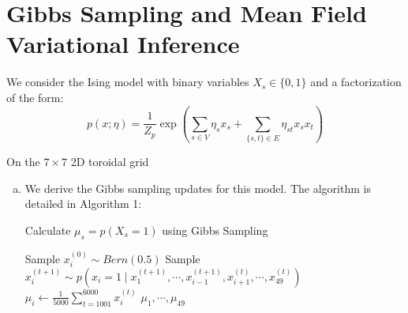 \documentclass[paper=a4, fontsize=11pt]{scrartcl} %
\numberwithin{equation}{section} %
\numberwithin{figure}{section} %
\numberwithin{table}{section} %
\begin{document}
\section{Gibbs Sampling and Mean Field Variational Inference}

We consider the Ising model with binary variables $X_s\in\{0,1\}$ and a factorization of the form:
\begin{equation}
p(x;\eta)=\frac{1}{Z_p}\exp\left( \sum_{s\in V} \eta_s x_s + \sum_{\{s,t\}\in E} \eta_{st} x_s x_t \right)
\end{equation}

On the $7\times7$ 2D toroidal grid

\begin{enumerate}[(a)]
	\item We derive the Gibbs sampling updates for this model. The algorithm is detailed in Algorithm 1:
	\begin{algorithm} %
		\caption{Calculate $\mu_s = p(X_s = 1)$ using Gibbs Sampling} %
		\label{alg1} %
		\begin{algorithmic}[1] %
			\State Sample {$x_{i}^{(0)} \sim Bern(0.5)$}
			\EndFor
			\State Sample \(x_i^{(t+1)} \sim p\left(x_i = 1 \mid x_1^{(t+1)},\cdots, x_{i-1}^{(t+1)}, x_{i+1}^{(t)},\cdots,x_{49}^{(t)}\right)\)
			\EndFor
			\EndFor
			\State $\mu_i \leftarrow \frac{1}{5000}\sum_{t=1001}^{6000}x_i^{(t)}$
			\EndFor
			\Return $\mu_1, \cdots, \mu_{49}$
		\end{algorithmic}
	\end{algorithm}
	

\end{enumerate}
\end{document}
